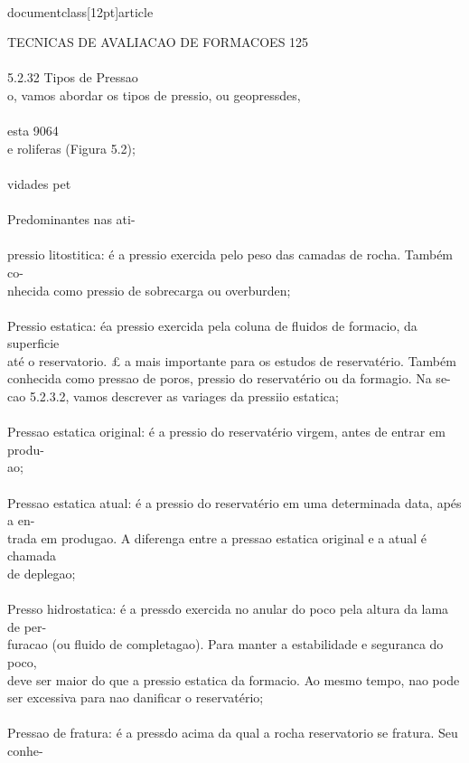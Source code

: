 \\documentclass[12pt]{article}
\begin{document}
{TECNICAS DE AVALIACAO DE FORMACOES 125\\
\\
5.2.32 Tipos de Pressao\\
o, vamos abordar os tipos de pressio, ou geopressdes,\\
\\
esta 9064\\
e roliferas (Figura 5.2);\\
\\
vidades pet\\
\\
Predominantes nas ati-\\
\\
pressio litostitica: é a pressio exercida pelo peso das camadas de rocha. Também co-\\
nhecida como pressio de sobrecarga ou overburden;\\
\\
Pressio estatica: éa pressio exercida pela coluna de fluidos de formacio, da superficie\\
até o reservatorio. £ a mais importante para os estudos de reservatério. Também\\
conhecida como pressao de poros, pressio do reservatério ou da formagio. Na se-\\
cao 5.2.3.2, vamos descrever as variages da pressiio estatica;\\
\\
Pressao estatica original: é a pressio do reservatério virgem, antes de entrar em produ-\\
ao;\\
\\
Pressao estatica atual: é a pressio do reservatério em uma determinada data, apés a en-\\
trada em produgao. A diferenga entre a pressao estatica original e a atual é chamada\\
de deplegao;\\
\\
Presso hidrostatica: é a pressdo exercida no anular do poco pela altura da lama de per-\\
furacao (ou fluido de completagao). Para manter a estabilidade e seguranca do poco,\\
deve ser maior do que a pressio estatica da formacio. Ao mesmo tempo, nao pode\\
ser excessiva para nao danificar o reservatério;\\
\\
Pressao de fratura: é a pressdo acima da qual a rocha reservatorio se fratura. Seu conhe-\\
}
\end{document}
